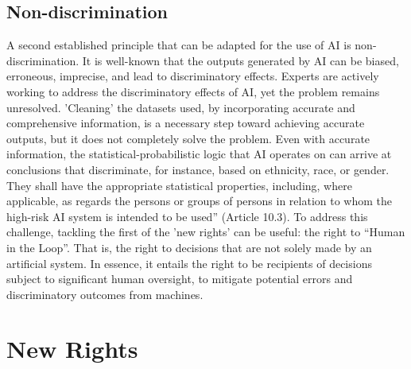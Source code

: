 \subsection{Non-discrimination}
A second established principle that can be adapted for the use of AI is non-discrimination. It is well-known that the outputs generated by AI can be biased, erroneous, imprecise, and lead to discriminatory effects. Experts are actively working to address the discriminatory effects of AI, yet the problem remains unresolved. 'Cleaning' the datasets used, by incorporating accurate and comprehensive information, is a necessary step toward achieving accurate outputs, but it does not completely solve the problem. Even with accurate information, the statistical-probabilistic logic that AI operates on can arrive at conclusions that discriminate, for instance, based on ethnicity, race, or gender. They shall have the appropriate statistical properties, including, where applicable, as regards the persons or groups of persons in relation to whom the high-risk AI system is intended to be used” (Article 10.3). To address this challenge, tackling the first of the 'new rights' can be useful: the right to “Human in the Loop”. That is, the right to decisions that are not solely made by an artificial system. In essence, it entails the right to be recipients of decisions subject to significant human oversight, to mitigate potential errors and discriminatory outcomes from machines.

\section{New Rights}

